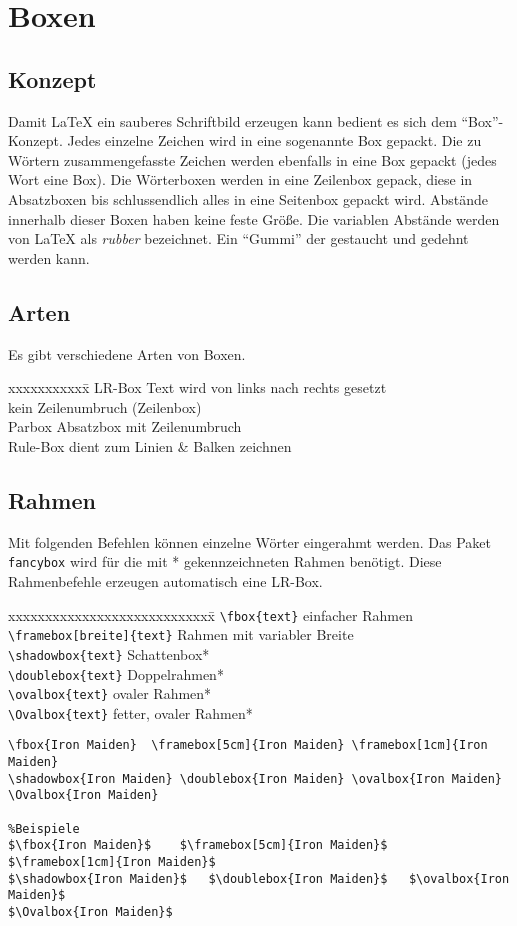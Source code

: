 \chapter{Boxen}
\section{Konzept}
Damit \LaTeX{} ein sauberes Schriftbild erzeugen kann bedient es sich dem ``Box''-Konzept. Jedes einzelne Zeichen wird in eine sogenannte Box gepackt. Die zu Wörtern zusammengefasste Zeichen werden ebenfalls in eine Box gepackt (jedes Wort eine Box). Die Wörterboxen werden in eine Zeilenbox gepack, diese in Absatzboxen bis schlussendlich alles in eine Seitenbox gepackt wird. Abstände innerhalb dieser Boxen haben keine feste Größe. Die variablen Abstände werden von \LaTeX{} als \textit{rubber} bezeichnet. Ein ``Gummi'' der gestaucht und gedehnt werden kann.
\section{Arten}
Es gibt verschiedene Arten von Boxen.
\begin{tabbing}
xxxxxxxxxxx\=\kill
LR-Box		\>Text wird von links nach rechts gesetzt\\
			\>kein Zeilenumbruch (Zeilenbox)\\
Parbox 		\>Absatzbox mit Zeilenumbruch\\
Rule-Box		\>dient zum Linien \& Balken zeichnen\\
\end{tabbing}
\newpage
\section{Rahmen}
Mit folgenden Befehlen können einzelne Wörter eingerahmt werden. Das Paket \verb=fancybox= wird für die mit * gekennzeichneten Rahmen benötigt. Diese Rahmenbefehle erzeugen automatisch eine LR-Box.
\begin{tabbing}
xxxxxxxxxxxxxxxxxxxxxxxxxxxx\=\kill
\verb=\fbox{text}=				\>einfacher Rahmen\\
\verb=\framebox[breite]{text}=		\>Rahmen mit variabler Breite\\
\verb=\shadowbox{text}= 			\>Schattenbox*\\
\verb=\doublebox{text}=			\>Doppelrahmen*\\
\verb=\ovalbox{text}=				\>ovaler Rahmen*\\
\verb=\Ovalbox{text}=				\>fetter, ovaler Rahmen*\\
\end{tabbing}
\begin{lstlisting}[caption={Rahmenbeispiele}, escapechar=$]
\fbox{Iron Maiden}	\framebox[5cm]{Iron Maiden}	\framebox[1cm]{Iron Maiden}
\shadowbox{Iron Maiden}	\doublebox{Iron Maiden}	\ovalbox{Iron Maiden}
\Ovalbox{Iron Maiden}

%Beispiele
$\fbox{Iron Maiden}$	$\framebox[5cm]{Iron Maiden}$	$\framebox[1cm]{Iron Maiden}$
$\shadowbox{Iron Maiden}$	$\doublebox{Iron Maiden}$	$\ovalbox{Iron Maiden}$
$\Ovalbox{Iron Maiden}$
\end{lstlisting}

